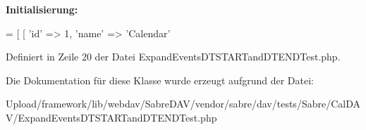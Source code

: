 {\bfseries Initialisierung\+:}
\begin{DoxyCode}
= [
        [
            \textcolor{stringliteral}{'id'}           => 1,
            \textcolor{stringliteral}{'name'}         => \textcolor{stringliteral}{'Calendar'}
\end{DoxyCode}


Definiert in Zeile 20 der Datei Expand\+Events\+D\+T\+S\+T\+A\+R\+Tand\+D\+T\+E\+N\+D\+Test.\+php.



Die Dokumentation für diese Klasse wurde erzeugt aufgrund der Datei\+:\begin{DoxyCompactItemize}
\item 
Upload/framework/lib/webdav/\+Sabre\+D\+A\+V/vendor/sabre/dav/tests/\+Sabre/\+Cal\+D\+A\+V/Expand\+Events\+D\+T\+S\+T\+A\+R\+Tand\+D\+T\+E\+N\+D\+Test.\+php\end{DoxyCompactItemize}
